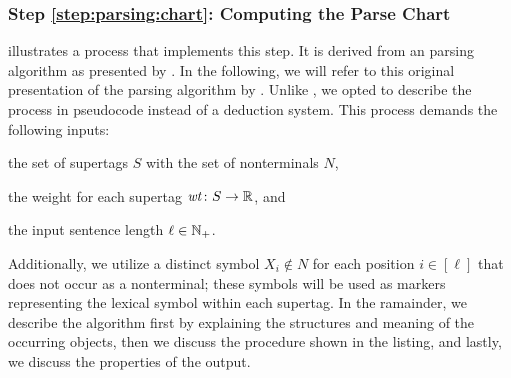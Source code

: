 \documentclass[../../document.tex]{subfiles}
\begin{document}
    \subsubsection*{Step \ref{step:parsing:chart}: Computing the Parse Chart}
     illustrates a process that implements this step.
    It is derived from an  parsing algorithm as presented by \citet[the na\"ive algorithm in Section~3]{Burden05}.
    In the following, we will refer to this original presentation of the parsing algorithm by .
    Unlike , we opted to describe the process in pseudocode instead of a deduction system.
    This process demands the following inputs:
    \begin{inparaitem}[]
        \item the set of  supertags \(S\) with the set of nonterminals \(N\),
        \item the weight for each supertag \(\mathit{wt}\colon S \to \mathbb{R}\), and
        \item the input sentence length \(\ell \in \mathbb{N}_+\).
    \end{inparaitem}
    Additionally, we utilize a distinct symbol \(X_i \notin N\) for each position \(i \in [\ell]\) that does not occur as a nonterminal; these symbols will be used as markers representing the lexical symbol within each supertag.
    In the ramainder, we describe the algorithm first by explaining the structures and meaning of the occurring objects, then we discuss the procedure shown in the listing, and lastly, we discuss the properties of the output.
\end{document}
